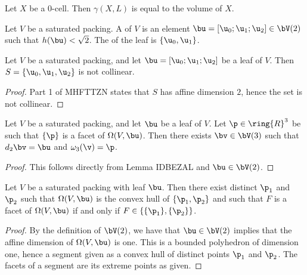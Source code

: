 \begin{lemma} Let $X$ be a $0$-cell.  Then $\gamma(X,L)$ is equal to
the volume of $X$.
\end{lemma}



\begin{definition}[leaf] 
Let $V$ be a saturated packing.  A  of $V$ is an element $\bu=[\u_0;\u_1;\u_2] \in \bV(2)$ such
that $h(\bu) < \sqrt2$.  The  of the leaf is $\{\u_0,\u_1\}$.
\end{definition}





\begin{lemma} Let $V$ be a saturated packing, and let $\bu = [\u_0;\u_1;\u_2]$ be a leaf of $V$.
Then $S=\{\u_0,\u_1,\u_2\}$ is not collinear.
\end{lemma}

\begin{proof}  Part 1 of MHFTTZN states that $S$ has affine dimension $2$, hence the set is not
collinear.
\end{proof}





\begin{lemma}\label{lemma:facetv}  Let $V$ be a saturated packing, and let $\bu$ be a leaf of $V$.  Let
$\p\in\ring{R}^3$ be such that $\{\p\}$ is a facet of $\Omega(V,\bu)$.  Then
there exists $\bv\in \bV(3)$ such that $d_2\bv = \bu$ and $\omega_3(\v)=\p$.
\end{lemma}

\begin{proof} This follows directly from Lemma IDBEZAL and $\bu\in \bV(2)$.
\end{proof}

\begin{lemma}\label{lemma:p1p2} 
Let $V$ be a saturated packing with leaf $\bu$.  Then there exist distinct $\p_1$ and $\p_2$ such
that $\Omega(V,\bu)$ is the convex hull of $\{\p_1,\p_2\}$ and such that
$F$ is a facet of $\Omega(V,\bu)$ if and only if $F\in \{\{\p_1\},\{\p_2\}\}$.
\end{lemma}

\begin{proof}  By the definition of $\bV(2)$,  we have that $\bu\in \bV(2)$ implies that
the affine dimension of $\Omega(V,\bu)$ is one.  This is a bounded polyhedron of dimension one,
hence a segment given as a convex hull of distinct points $\p_1$ and $\p_2$.  The facets of a segment
are its extreme points as given.
\end{proof}

